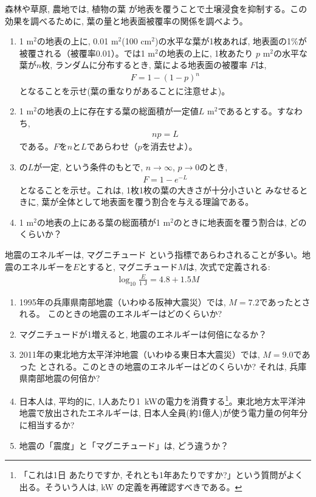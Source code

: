 \begin{exq}\label{exq:func_veg_cover_erosion} 森林や草原, 農地では, 植物の葉
が地表を覆うことで土壌浸食を抑制する。この効果を調べるために, 葉の量と地表面被覆率の関係を調べよう。
\begin{enumerate}
\item 1 m$^2$の地表の上に, 0.01 m$^2$(100 cm$^2$)の水平な葉が1枚あれば, 
地表面の1\%が被覆される（被覆率0.01）。では1 m$^2$の地表の上に, 1枚あたり
$p$ m$^2$の水平な葉が$n$枚, ランダムに分布するとき, 葉による地表面の被覆率
$F$は, 
\begin{eqnarray}
F=1-(1-p)^n
\end{eqnarray}
となることを示せ(葉の重なりがあることに注意せよ)。
\item 1 m$^2$の地表の上に存在する葉の総面積が一定値$L$ m$^2$であるとする。すなわち, 
\begin{eqnarray}np=L\label{eq:func_L_Poisson03}\end{eqnarray}
である。$F$を$n$と$L$であらわせ（$p$を消去せよ）。
\item {}の$L$が一定, という条件のもとで, 
$n \rightarrow \infty$, $p\rightarrow 0$のとき, 
\begin{eqnarray}F=1-e^{-L}\end{eqnarray}
となることを示せ。これは, 1枚1枚の葉の大きさが十分小さいと
みなせるときに, 葉が全体として地表面を覆う割合を与える理論である。
\item 1 m$^2$の地表の上にある葉の総面積が1 m$^2$のときに地表面を覆う割合は, どのくらいか？
\end{enumerate}\end{exq}
\mv

\begin{exq}\label{q:func_log_magnitude} 地震のエネルギーは, 
マグニチュード
という指標であらわされることが多い。地震のエネルギーを$E$とすると, 
マグニチュード$M$は, 次式で定義される:
\begin{eqnarray}
\log_{10} \frac{E}{1\text{ J}} = 4.8 + 1.5 M
\end{eqnarray}
\begin{enumerate}
\item 1995年の兵庫県南部地震（いわゆる阪神大震災）では, $M=7.2$であったとされる。
このときの地震のエネルギーはどのくらいか?
\item マグニチュードが1増えると, 地震のエネルギーは何倍になるか？
\item 2011年の東北地方太平洋沖地震（いわゆる東日本大震災）では, $M=9.0$であった
とされる。このときの地震のエネルギーはどのくらいか? それは, 兵庫県南部地震の何倍か?
\item 日本人は, 平均的に, 1人あたり1~kWの電力を消費する\footnote{「これは1日
あたりですか, それとも1年あたりですか?」という質問がよく出る。そういう人は, kW
の定義を再確認すべきである。}。東北地方太平洋沖地震で放出されたエネルギーは, 
日本人全員(約1億人)が使う電力量の何年分に相当するか?
\item 地震の「震度」と「マグニチュード」は, どう違うか？
\end{enumerate}\end{exq}
\hv


